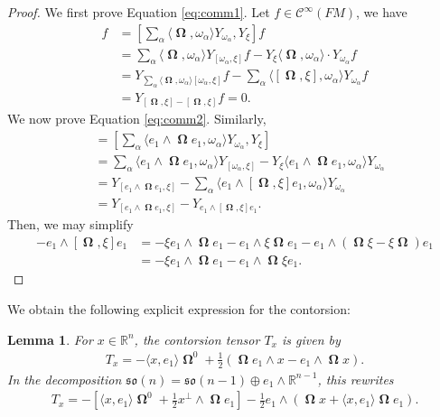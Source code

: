 \documentclass[12pt]{amsart}
\numberwithin{numbering}{section}
\theoremstyle{plain}
\newtheorem{lem}[numbering]{Lemma}
\theoremstyle{definition}
\theoremstyle{remark}
\numberwithin{equation}{section}
\DeclareMathOperator{\oo}{\mathbf{\Omega}}
\newcommand{\con}[1]{T_{#1}}
\newcommand{\R}{\mathbb{R}}
\newcommand{\frk}[1]{\mathfrak{#1}}
\begin{document}
\begin{proof}
We first prove Equation \eqref{eq:comm1}. Let $f \in \mathcal{C}^\infty(FM)$, we have
\begin{align*}
[Y_{\oo}, Y_\xi] f 
&= \left [\sum_\alpha \langle \oo, \omega_\alpha \rangle Y_{\omega_\alpha}, Y_\xi \right ] f \\
&= \sum_\alpha \langle \oo, \omega_\alpha \rangle Y_{[\omega_\alpha, \xi]} f - Y_\xi \langle \oo, \omega_\alpha \rangle \cdot Y_{\omega_\alpha} f \\
&= Y_{\sum_\alpha \langle \oo, \omega_\alpha \rangle [\omega_\alpha, \xi]} f - \sum_\alpha \langle [\oo, \xi], \omega_\alpha \rangle Y_{\omega_\alpha} f \\
&= Y_{[\oo, \xi] - [\oo, \xi]} f = 0.
\end{align*}
We now prove Equation \eqref{eq:comm2}. Similarly,
\begin{align*}
[Y_{e_1 \wedge \oo e_1}, Y_\xi] 
&= \left [ \sum_\alpha \langle e_1 \wedge \oo e_1, \omega_\alpha \rangle Y_{\omega_\alpha},  Y_\xi \right ] \\
&= \sum_\alpha \langle e_1 \wedge \oo e_1, \omega_\alpha \rangle Y_{[\omega_\alpha, \xi]} - Y_\xi \langle e_1 \wedge \oo e_1, \omega_\alpha \rangle Y_{\omega_\alpha} \\
&= Y_{[e_1 \wedge \oo e_1, \xi]} - \sum_\alpha \langle e_1 \wedge [\oo, \xi] e_1, \omega_\alpha \rangle Y_{\omega_\alpha} \\
&= Y_{[e_1 \wedge \oo e_1, \xi]} - Y_{e_1 \wedge [\oo, \xi] e_1}.
\end{align*}
Then, we may simplify 
\begin{align*}
[e_1 \wedge \oo e_1, \xi] - e_1 \wedge [\oo, \xi] e_1
&= - \xi e_1 \wedge \oo e_1 - e_1 \wedge \xi \oo e_1 - e_1 \wedge (\oo \xi - \xi \oo) e_1 \\ 
&= - \xi e_1 \wedge \oo e_1 - e_1 \wedge \oo \xi e_1.
\end{align*}
\end{proof}

We obtain the following explicit expression for the contorsion:
\begin{lem} \label{lem:contorsion}
For $x \in \R^n$, the contorsion tensor $\con{x}$ is given by
\begin{align*}
\con{x} = - \langle x, e_1 \rangle \oo^0 + \frac{1}{2}(\oo e_1 \wedge x - e_1 \wedge \oo x).
\end{align*}
In the decomposition $\frk{so}(n) = \frk{so}(n-1) \oplus e_1 \wedge \R^{n-1}$, this rewrites 
\begin{align} \label{eq:decomp_contorsion}
\con{x} = - \left [\langle x, e_1 \rangle \oo^0 + \frac{1}{2} x^\perp \wedge \oo e_1 \right ] - \frac{1}{2} e_1 \wedge (\oo x + \langle x, e_1 \rangle \oo e_1).
\end{align}
\end{lem}
\end{document}
